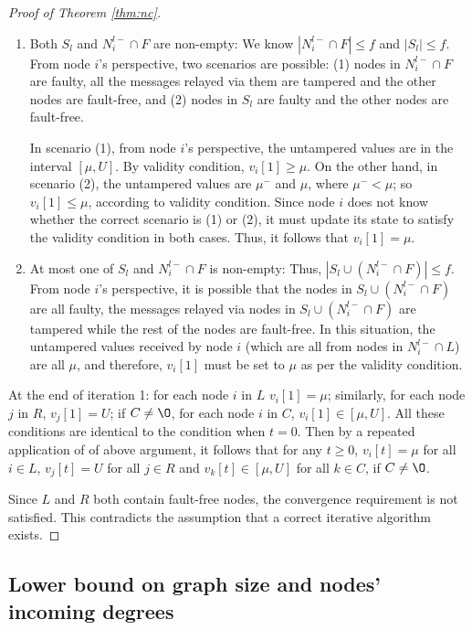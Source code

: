 \documentclass[letterpaper, 11pt]{article}
\begin{document}
\begin{proof}[Proof of Theorem \ref{thm:nc}]
\begin{enumerate}[label=\emph{(\alph*)}]
\item Both $S_l$ and $N_i^{l-}\cap F$ are non-empty: We know $|N_i^{l-}\cap F|\le f$ and $|S_l|\le f$.  From node $i$'s perspective, two scenarios are possible: (1) nodes in $N_i^{l-}\cap F$ are faulty, all the messages relayed via them are tampered and the other nodes are fault-free, and (2) nodes in $S_l$ are faulty and the other nodes are fault-free.

In scenario (1), from node $i$'s perspective, the untampered values are in the interval $[\mu, U]$. By validity condition, $v_i[1]\ge \mu$. On the other hand, in scenario (2), the untampered values are $\mu^{-}$ and $\mu$, where $\mu^{-}<\mu$; so $v_i[1]\le \mu$, according to validity condition. Since node $i$ does not know whether the correct scenario is (1) or (2), it must update its state to satisfy the validity condition in both cases. Thus, it follows that $v_i[1]=\mu$.

\item At most one of $S_l$ and $N_i^{l-}\cap F$ is non-empty: Thus, $|S_l\cup (N_i^{l-}\cap F)|\le f$. From node $i$'s perspective, it is possible that the nodes in $S_l\cup (N_i^{l-}\cap F)$ are all faulty, the messages relayed via nodes in $S_l\cup (N_i^{l-}\cap F)$ are tampered while the rest of the nodes are fault-free. In this situation, the untampered values received by node $i$ (which are all from nodes in $N_i^{l-}\cap L$) are all $\mu$, and therefore, $v_i[1]$ must be set to $\mu$ as per the validity condition.
\end{enumerate}

At the end of iteration 1: for each node $i$ in $L$ $v_i[1]=\mu$; similarly, for each node $j$ in $R$, $v_j[1]=U$; if $C\not=\O$, for each node $i$ in $C$, $v_i[1]\in [\mu, U]$. All these conditions are identical to the condition when $t=0$. Then by a repeated application of of above argument, it follows that for any $t\ge 0$, $v_i[t]=\mu$ for all $i\in L$, $v_j[t]=U$ for all $j\in R$ and $v_k[t]\in [\mu, U]$ for all $k\in C$, if $C\not=\O$.

Since $L$ and $R$ both contain fault-free nodes, the convergence requirement is not satisfied. This contradicts the assumption that a correct iterative algorithm exists.
\end{proof}

\subsection{Lower bound on graph size and nodes' incoming degrees} \label{app:cdegree}
\end{document}
